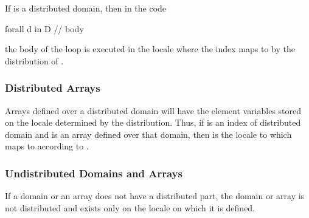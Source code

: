 \begin{example}
If  is a distributed domain, then in the code
\begin{chapel}
forall d in D {
  // body
}
\end{chapel}
the body of the loop is executed in the locale where the
index  maps to by the distribution of .
\end{example}

\subsubsection{Distributed Arrays}
\label{Distributed_Arrays}

Arrays defined over a distributed domain will have the element
variables stored on the locale determined by the distribution.  Thus,
if  is an index of distributed domain  and  is
an array defined over that domain, then  is the
locale to which  maps to according to .

\subsubsection{Undistributed Domains and Arrays}
\label{Undistributed_Domains_and_Arrays}

If a domain or an array does not have a distributed part, the domain
or array is not distributed and exists only on the locale on which it
is defined.

